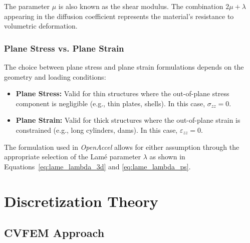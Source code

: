 \documentclass[12pt]{extarticle}
\newcommand{\<}{\langle}
\renewcommand{\>}{\rangle}
\theoremstyle{definition}
\begin{document}
The parameter $\mu$ is also known as the shear modulus. The combination $2\mu + \lambda$ appearing in the diffusion coefficient represents the material's resistance to volumetric deformation.

\subsubsection{Plane Stress vs. Plane Strain}

The choice between plane stress and plane strain formulations depends on the geometry and loading conditions:

\begin{itemize}
    \item \textbf{Plane Stress:} Valid for thin structures where the out-of-plane stress component is negligible (e.g., thin plates, shells). In this case, $\sigma_{zz} = 0$.

    \item \textbf{Plane Strain:} Valid for thick structures where the out-of-plane strain is constrained (e.g., long cylinders, dams). In this case, $\varepsilon_{zz} = 0$.
\end{itemize}

The formulation used in \textit{OpenAccel} allows for either assumption through the appropriate selection of the Lam\'e parameter $\lambda$ as shown in Equations~\ref{eq:lame_lambda_3d} and \ref{eq:lame_lambda_ps}.

\section{Discretization Theory}

\subsection{CVFEM Approach}
\end{document}
